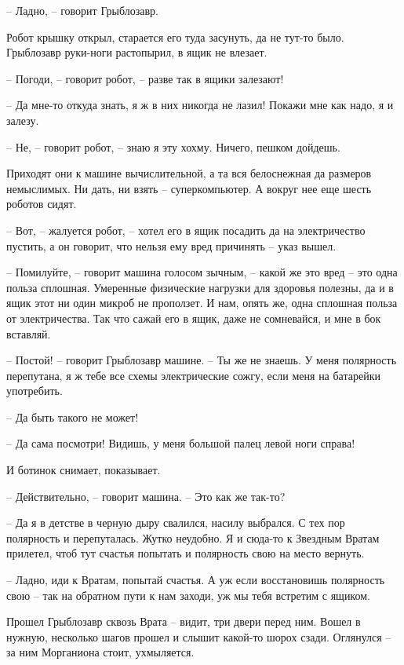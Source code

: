 \documentclass[ebook,oneside,final,openright]{memoir}
\begin{document}
– Ладно, – говорит Грыблозавр.\par
Робот крышку открыл, старается его туда засунуть, да не тут-то было. Грыблозавр руки-ноги растопырил, в ящик не влезает. \par
– Погоди, – говорит робот, – разве так в ящики залезают! \par
– Да мне-то откуда знать, я ж в них никогда не лазил! Покажи мне как надо, я и залезу. \par
– Не, – говорит робот, – знаю я эту хохму. Ничего, пешком дойдешь.\par
\par
Приходят они к машине вычислительной, а та вся белоснежная да размеров немыслимых. Ни дать, ни взять – суперкомпьютер. А вокруг нее еще шесть роботов сидят. \par
– Вот, – жалуется робот, – хотел его в ящик посадить да на электричество пустить, а он говорит, что нельзя ему вред причинять – указ вышел. \par
– Помилуйте, – говорит машина голосом зычным, – какой же это вред – это одна польза сплошная. Умеренные физические нагрузки для здоровья полезны, да и в ящик этот ни один микроб не проползет. И нам, опять же, одна сплошная польза от электричества. Так что сажай его в ящик, даже не сомневайся, и мне в бок вставляй. \par
– Постой! – говорит Грыблозавр машине. – Ты же не знаешь. У меня полярность перепутана, я ж тебе все схемы электрические сожгу, если меня на батарейки употребить. \par
– Да быть такого не может! \par
– Да сама посмотри! Видишь, у меня большой палец левой ноги справа! \par
И ботинок снимает, показывает. \par
– Действительно, – говорит машина. – Это как же так-то? \par
– Да я в детстве в черную дыру свалился, насилу выбрался. С тех пор полярность и перепуталась. Жутко неудобно. Я и сюда-то к Звездным Вратам прилетел, чтоб тут счастья попытать и полярность свою на место вернуть. \par
– Ладно, иди к Вратам, попытай счастья. А уж если восстановишь полярность свою – так на обратном пути к нам заходи, уж мы тебя встретим с ящиком.\par
\par
Прошел Грыблозавр сквозь Врата – видит, три двери перед ним. Вошел в нужную, несколько шагов прошел и слышит какой-то шорох сзади. Оглянулся – за ним Морганиона стоит, ухмыляется. \par
\end{document}
